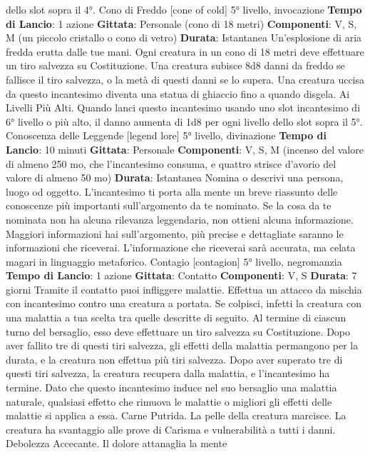 \begin{multicols}{2}
dello slot sopra il 4°.
Cono di Freddo
[cone of cold]
5° livello, invocazione
\textbf{Tempo di Lancio}: 1 azione
\textbf{Gittata}: Personale (cono di 18 metri)
\textbf{Componenti}: V, S, M (un piccolo cristallo o cono di
vetro)
\textbf{Durata}: Istantanea
Un’esplosione di aria fredda erutta dalle tue mani. Ogni
creatura in un cono di 18 metri deve effettuare un tiro
salvezza su Costituzione. Una creatura subisce 8d8
danni da freddo se fallisce il tiro salvezza, o la metà di
questi danni se lo supera.
Una creatura uccisa da questo incantesimo diventa una
statua di ghiaccio fino a quando disgela.
Ai Livelli Più Alti. Quando lanci questo incantesimo
usando uno slot incantesimo di 6° livello o più alto, il
danno aumenta di 1d8 per ogni livello dello slot sopra il
5°.
Conoscenza delle Leggende
[legend lore]
5° livello, divinazione
\textbf{Tempo di Lancio}: 10 minuti
\textbf{Gittata}: Personale
\textbf{Componenti}: V, S, M (incenso del valore di almeno
250 mo, che l’incantesimo consuma, e quattro strisce
d’avorio del valore di almeno 50 mo)
\textbf{Durata}: Istantanea
Nomina o descrivi una persona, luogo od oggetto.
L’incantesimo ti porta alla mente un breve riassunto
delle conoscenze più importanti sull’argomento da te
nominato. Se la cosa da te nominata non ha alcuna
rilevanza leggendaria, non ottieni alcuna informazione.
Maggiori informazioni hai sull’argomento, più precise e
dettagliate saranno le informazioni che riceverai.
L’informazione che riceverai sarà accurata, ma celata
magari in linguaggio metaforico.
Contagio
[contagion]
5° livello, negromanzia
\textbf{Tempo di Lancio}: 1 azione
\textbf{Gittata}: Contatto
\textbf{Componenti}: V, S
\textbf{Durata}: 7 giorni
Tramite il contatto puoi infliggere malattie. Effettua un
attacco da mischia con incantesimo contro una creatura
a portata. Se colpisci, infetti la creatura con una
malattia a tua scelta tra quelle descritte di seguito.
Al termine di ciascun turno del bersaglio, esso deve
effettuare un tiro salvezza su Costituzione. Dopo aver
fallito tre di questi tiri salvezza, gli effetti della malattia
permangono per la durata, e la creatura non effettua più
tiri salvezza. Dopo aver superato tre di questi tiri
salvezza, la creatura recupera dalla malattia, e
l’incantesimo ha termine.
Dato che questo incantesimo induce nel suo bersaglio
una malattia naturale, qualsiasi effetto che rimuova le
malattie o migliori gli effetti delle malattie si applica a
essa.
Carne Putrida. La pelle della creatura marcisce. La
creatura ha svantaggio alle prove di Carisma e
vulnerabilità a tutti i danni.
Debolezza Accecante. Il dolore attanaglia la mente

\end{multicols}
